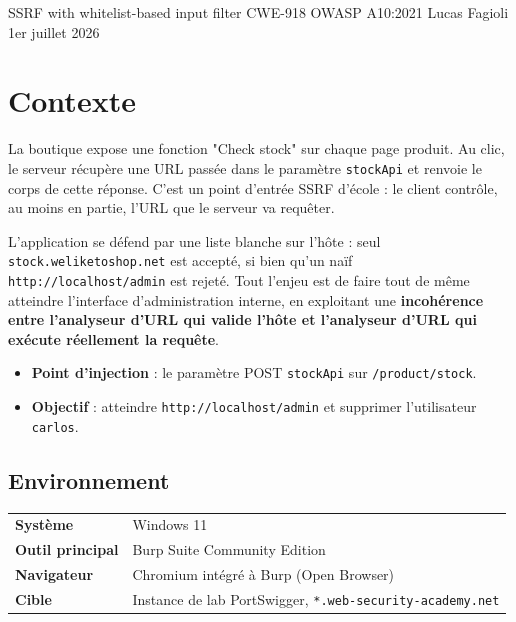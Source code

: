 \documentclass[11pt,a4paper]{article}
\begin{document}
\makecover
  {SSRF with whitelist-based input filter}
  {CWE-918 \textperiodcentered{} OWASP A10\string:2021}
  {
  }
  {Lucas Fagioli}
  {1er juillet 2026}

\section{Contexte}
La boutique expose une fonction "Check stock" sur chaque page produit.
Au clic, le serveur récupère une URL passée dans le paramètre \texttt{stockApi}
et renvoie le corps de cette réponse. C'est un point d'entrée SSRF d'école : le
client contrôle, au moins en partie, l'URL que le serveur va requêter.

L'application se défend par une liste blanche sur l'hôte : seul
\texttt{stock.weliketoshop.net} est accepté, si bien qu'un naïf
\texttt{http://localhost/admin} est rejeté. Tout l'enjeu est de faire tout de
même atteindre l'interface d'administration interne, en exploitant une
\textbf{incohérence entre l'analyseur d'URL qui valide l'hôte et l'analyseur
d'URL qui exécute réellement la requête}.

\begin{itemize}
  \item \textbf{Point d'injection} : le paramètre POST \texttt{stockApi} sur \texttt{/product/stock}.
  \item \textbf{Objectif} : atteindre \texttt{http://localhost/admin} et supprimer l'utilisateur \texttt{carlos}.
\end{itemize}

\subsection{Environnement}
\renewcommand{\arraystretch}{1.3}
\begin{tabular}{@{}p{}p{}@{}}
  \textbf{Système}        & Windows 11 \\
  \textbf{Outil principal}& Burp Suite Community Edition \\
  \textbf{Navigateur}     & Chromium intégré à Burp (Open Browser) \\
  \textbf{Cible}          & Instance de lab PortSwigger, \texttt{*.web-security-academy.net} \\
\end{tabular}
\end{document}
